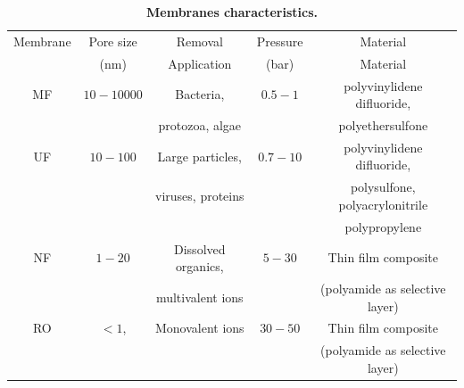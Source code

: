 \begin{table}[ht]
 \begin{center}
 \caption{\textbf{Membranes characteristics.}}
  \label{tbl1_intro}
  \begin{tabular}{ccccc}
        \hline
        Membrane & Pore size & Removal & Pressure & Material\\ 
         & (nm) & Application & (bar) & Material\\
        \hline
        MF & $10-10000$ & Bacteria, & $0.5-1$ & polyvinylidene difluoride,\\
         & &  protozoa, algae &  &  polyethersulfone\\
         UF & $10-100$ &Large particles,  & $0.7-10$ & polyvinylidene difluoride,\\
         & &  viruses, proteins &  &  polysulfone, polyacrylonitrile\\
         & &  &  &  polypropylene\\
        NF & $1-20$ &Dissolved organics,   & $5-30$ & Thin film composite\\
         & &  multivalent ions&  & (polyamide as selective layer)\\
         RO & $<1$, & Monovalent ions   & $30-50$ & Thin film composite\\
         & &  &  & (polyamide as selective layer)\\
        \hline
  \end{tabular}
 \end{center}
\end{table}




